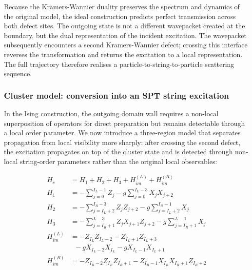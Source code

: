 \documentclass[aps,floatfix,10pt,amssymb,amsfont,amsmath,superscriptaddress,float,nofootinbib,longbibliography,nobalancelastpage,twocolumn]{revtex4-2}
\begin{document}
Because the Kramers-Wannier duality preserves the spectrum and dynamics of the original model, the ideal construction predicts perfect transmission across both defect sites. The outgoing state is not a different wavepacket created at the boundary, but the dual representation of the incident excitation. The wavepacket subsequently encounters a second Kramers-Wannier defect; crossing this interface reverses the transformation and returns the excitation to a local representation. The full trajectory therefore realises a particle-to-string-to-particle scattering sequence.

\subsubsection{Cluster model: conversion into an SPT string excitation}
In the Ising construction, the outgoing domain wall requires a non-local superposition of operators for direct preparation but remains detectable through a local order parameter. We now introduce a three-region model that separates propagation from local visibility more sharply: after crossing the second defect, the excitation propagates on top of the cluster state and is detected through non-local string-order parameters rather than the original local observables:

\begin{align*}
    H_{c} &= H_1 + H_2 + H_3 + H_{im}^{(L)} + H_{im}^{(R)}\\
    H_1 &=-\sum_{j=0}^{I_L-1} Z_j- g\sum_{j=0}^{I_L-3}X_jX_{j+2}  \\
    H_2 &=- \sum_{j=I_{L}+2}^{I_R-3} Z_{j}Z_{j+2} -g \sum_{j=I_{L}+2}^{I_R-1} X_j\\
    H_3 &= - \sum_{j=I_R+1}^{L-3}Z_j X_{j+1}Z_{j+2} - g \sum_{j=I_R+1}^{L-1}  X_j\\
    H^{(L)}_{im} &= -Z_{I_L}Z_{I_L+2} - Z_{I_L+1}Z_{I_L+3}\\
    &\;\;-g X_{I_L-2}X_{I_L} -g X_{I_L-1} X_{I_L+1}\\
    H^{(R)}_{im} &= -Z_{I_R-2}Z_{I_R}Z_{I_R+1} - Z_{I_R-1}X_{I_R}X_{I_R+1}Z_{I_R+2}
\end{align*}
\end{document}
